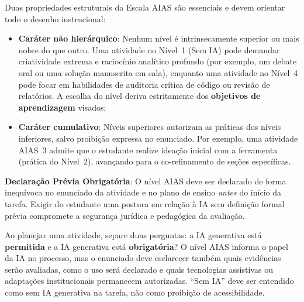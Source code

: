 Duas propriedades estruturais da Escala AIAS s{\~a}o essenciais e devem orientar todo o desenho instrucional:
\begin{itemize}
  \item \textbf{Car{\'a}ter n{\~a}o hier{\'a}rquico}: Nenhum n{\'i}vel {\'e} intrinsecamente superior ou mais nobre do que outro. Uma atividade no N{\'i}vel~1 (Sem IA) pode demandar criatividade extrema e racioc{\'i}nio anal{\'i}tico profundo (por exemplo, um debate oral ou uma solu{\c c}{\~a}o manuscrita em sala), enquanto uma atividade no N{\'i}vel~4 pode focar em habilidades de auditoria cr{\'i}tica de c{\'o}digo ou revis{\~a}o de relat{\'o}rios. A escolha do n{\'i}vel deriva estritamente dos \textbf{objetivos de aprendizagem} visados;
  \item \textbf{Car{\'a}ter cumulativo}: N{\'i}veis superiores autorizam as pr{\'a}ticas dos n{\'i}veis inferiores, salvo proibi{\c c}{\~a}o expressa no enunciado. Por exemplo, uma atividade AIAS~3 admite que o estudante realize idea{\c c}{\~a}o inicial com a ferramenta (pr{\'a}tica do N{\'i}vel~2), avan{\c c}ando para o co-refinamento de se{\c c}{\~o}es espec{\'i}ficas.
\end{itemize}

\begin{atencaopedagogica}
\textbf{Declara{\c c}{\~a}o Pr{\'e}via Obrigat{\'o}ria}: O n{\'i}vel AIAS deve ser declarado de forma inequ{\'i}voca no enunciado da atividade e no plano de ensino \emph{antes} do in{\'i}cio da tarefa. Exigir do estudante uma postura em rela{\c c}{\~a}o {\`a} IA sem defini{\c c}{\~a}o formal pr{\'e}via compromete a seguran{\c c}a jur{\'i}dica e pedag{\'o}gica da avalia{\c c}{\~a}o.
\end{atencaopedagogica}

Ao planejar uma atividade, separe duas perguntas: a IA generativa est{\'a} \textbf{permitida} e a IA generativa est{\'a} \textbf{obrigat{\'o}ria}? O n{\'i}vel AIAS informa o papel da IA no processo, mas o enunciado deve esclarecer tamb{\'e}m quais evid{\^e}ncias ser{\~a}o avaliadas, como o uso ser{\'a} declarado e quais tecnologias assistivas ou adapta{\c c}{\~o}es institucionais permanecem autorizadas. ``Sem IA'' deve ser entendido como sem IA generativa na tarefa, n{\~a}o como proibi{\c c}{\~a}o de acessibilidade.
